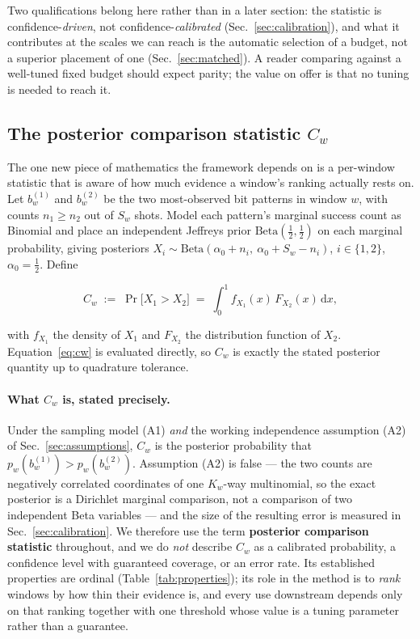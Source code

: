 \documentclass[preprint,11pt]{elsarticle}
\newcommand{\Cw}{C_w}
\begin{document}
Two qualifications belong here rather than in a later section: the
statistic is confidence-\emph{driven}, not confidence-\emph{calibrated}
(Sec.~\ref{sec:calibration}), and what it contributes at the scales we
can reach is the automatic selection of a budget, not a superior
placement of one (Sec.~\ref{sec:matched}). A reader comparing against a
well-tuned fixed budget should expect parity; the value on offer is that
no tuning is needed to reach it.

\subsection{The posterior comparison statistic $\Cw$}
\label{sec:cw}

The one new piece of mathematics the framework depends on is a per-window
statistic that is aware of how much evidence a window's ranking actually
rests on. Let $b^{(1)}_w$ and $b^{(2)}_w$ be the two most-observed bit
patterns in window $w$, with counts $n_1 \ge n_2$ out of $S_w$ shots.
Model each pattern's marginal success count as Binomial and place an
independent Jeffreys prior $\mathrm{Beta}(\tfrac12,\tfrac12)$
\cite{jeffreys1946} on each marginal probability, giving posteriors
$X_i\sim\mathrm{Beta}(\alpha_0+n_i,\ \alpha_0+S_w-n_i)$, $i\in\{1,2\}$,
$\alpha_0=\tfrac12$. Define

\begin{equation}
\Cw \;\mathrel{:=}\; \Pr\!\big[X_1 > X_2\big]
\;=\; \int_0^1 f_{X_1}(x)\,F_{X_2}(x)\,\mathrm{d}x ,
\label{eq:cw}
\end{equation}

with $f_{X_1}$ the density of $X_1$ and $F_{X_2}$ the distribution
function of $X_2$. Equation~\eqref{eq:cw} is evaluated directly, so
$\Cw$ is exactly the stated posterior quantity up to quadrature
tolerance.

\paragraph{What $\Cw$ is, stated precisely.} Under the sampling model
(A1) \emph{and} the working independence assumption (A2) of
Sec.~\ref{sec:assumptions}, $\Cw$ is the posterior probability that
$p_w(b^{(1)}_w) > p_w(b^{(2)}_w)$. Assumption (A2) is false --- the two
counts are negatively correlated coordinates of one $K_w$-way multinomial,
so the exact posterior is a Dirichlet marginal comparison, not a
comparison of two independent Beta variables --- and the size of the
resulting error is measured in Sec.~\ref{sec:calibration}. We therefore
use the term \textbf{posterior comparison statistic} throughout, and we
do \emph{not} describe $\Cw$ as a calibrated probability, a confidence
level with guaranteed coverage, or an error rate. Its established
properties are ordinal (Table~\ref{tab:properties}); its role in the
method is to \emph{rank}
windows by how thin their evidence is, and every use downstream depends
only on that ranking together with one threshold whose value is a tuning
parameter rather than a guarantee.
\end{document}

